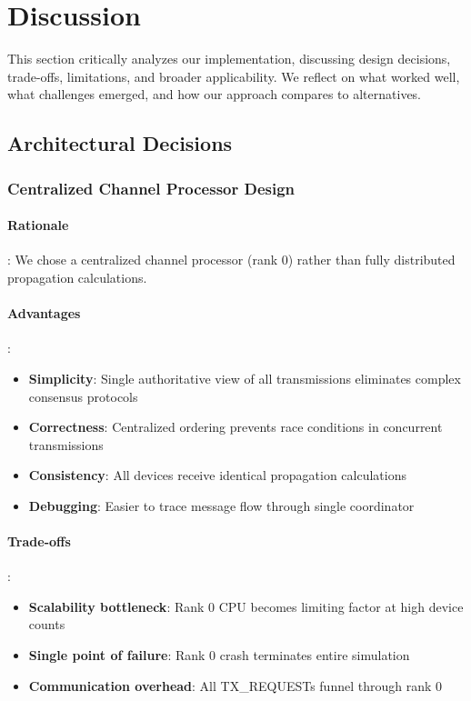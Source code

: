 \section{Discussion}
\label{sec:discussion}

This section critically analyzes our implementation, discussing design decisions, trade-offs, limitations, and broader applicability. We reflect on what worked well, what challenges emerged, and how our approach compares to alternatives.

\subsection{Architectural Decisions}

\subsubsection{Centralized Channel Processor Design}

\paragraph{Rationale}:
We chose a centralized channel processor (rank 0) rather than fully distributed propagation calculations.

\paragraph{Advantages}:
\begin{itemize}
    \item \textbf{Simplicity}: Single authoritative view of all transmissions eliminates complex consensus protocols
    \item \textbf{Correctness}: Centralized ordering prevents race conditions in concurrent transmissions
    \item \textbf{Consistency}: All devices receive identical propagation calculations
    \item \textbf{Debugging}: Easier to trace message flow through single coordinator
\end{itemize}

\paragraph{Trade-offs}:
\begin{itemize}
    \item \textbf{Scalability bottleneck}: Rank 0 CPU becomes limiting factor at high device counts
    \item \textbf{Single point of failure}: Rank 0 crash terminates entire simulation
    \item \textbf{Communication overhead}: All TX\_REQUESTs funnel through rank 0
\end{itemize}

